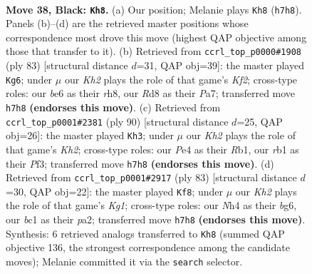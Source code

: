 \documentclass[11pt]{article}
\begin{document}
\clearpage

\begin{figure}[p]\centering
\begin{subfigure}{0.46\textwidth}\centering
\resizebox{\linewidth}{!}{%
\newchessgame
\chessboard[
  setfen={3r4/p6k/Pp2B2b/5p2/4pP1n/8/5K2/1RB5 b - - 9 38},
  showmover=false,
  pgfstyle=straightmove, color=movearrow, markmove={h7-h8}
]}
\caption{}
\end{subfigure}\hfill
\begin{subfigure}{0.46\textwidth}\centering
\resizebox{\linewidth}{!}{%
\newchessgame
\chessboard[
  setfen={7R/p4k2/1b2p3/1b1pB1pp/3P4/1P2K3/8/8 b - - 1 42},
  showmover=false,
  pgfstyle=straightmove, color=movearrow, markmove={f7-g6}
]}
\caption{}
\end{subfigure}
\\[4pt]
\begin{subfigure}{0.46\textwidth}\centering
\resizebox{\linewidth}{!}{%
\newchessgame
\chessboard[
  setfen={4b3/2B4p/8/2k4P/r4p2/P3pP2/6PK/1R6 w - - 2 46},
  showmover=false,
  pgfstyle=straightmove, color=movearrow, markmove={h2-h3}
]}
\caption{}
\end{subfigure}\hfill
\begin{subfigure}{0.46\textwidth}\centering
\resizebox{\linewidth}{!}{%
\newchessgame
\chessboard[
  setfen={3r2k1/6p1/R4pBp/7P/6b1/8/PP4K1/8 b - - 0 42},
  showmover=false,
  pgfstyle=straightmove, color=movearrow, markmove={g8-f8}
]}
\caption{}
\end{subfigure}
\caption{\textbf{Move 38, Black: \texttt{Kh8}.} (a) Our position; Melanie plays \texttt{Kh8} (\texttt{h7h8}). Panels (b)--(d) are the retrieved master positions whose correspondence most drove this move (highest QAP objective among those that transfer to it). (b) Retrieved from \texttt{ccrl\_top\_p0000\#1908} (ply 83) [structural distance $d$=31, QAP obj=39]: the master played \texttt{Kg6}; under $\mu$ our \emph{Kh2} plays the role of that game's \emph{Kf2}; cross-type roles: our \emph{b}e6 as their \emph{r}h8, our \emph{R}d8 as their \emph{P}a7; transferred move \texttt{h7h8} \textbf{(endorses this move)}. (c) Retrieved from \texttt{ccrl\_top\_p0001\#2381} (ply 90) [structural distance $d$=25, QAP obj=26]: the master played \texttt{Kh3}; under $\mu$ our \emph{Kh2} plays the role of that game's \emph{Kh2}; cross-type roles: our \emph{P}e4 as their \emph{R}b1, our \emph{r}b1 as their \emph{P}f3; transferred move \texttt{h7h8} \textbf{(endorses this move)}. (d) Retrieved from \texttt{ccrl\_top\_p0001\#2917} (ply 83) [structural distance $d$=30, QAP obj=22]: the master played \texttt{Kf8}; under $\mu$ our \emph{Kh2} plays the role of that game's \emph{Kg1}; cross-type roles: our \emph{N}h4 as their \emph{b}g6, our \emph{b}c1 as their \emph{p}a2; transferred move \texttt{h7h8} \textbf{(endorses this move)}. Synthesis: 6 retrieved analogs transferred to \texttt{Kh8} (summed QAP objective 136, the strongest correspondence among the candidate moves); Melanie committed it via the \texttt{search} selector.}
\label{fig:thought-m75}
\end{figure}
\end{document}
